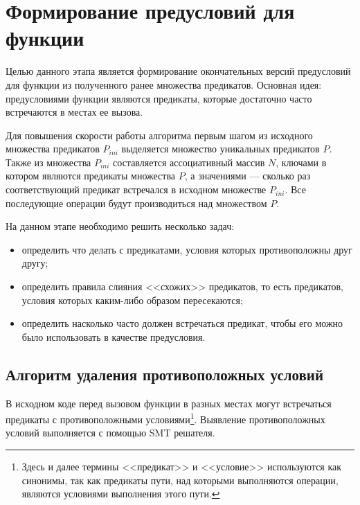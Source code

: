 \section{Формирование предусловий для функции}
\label{section:merging}
Целью данного этапа является формирование окончательных версий предусловий для функции из полученного ранее множества предикатов. Основная идея: предусловиями функции являются предикаты, которые достаточно часто встречаются в местах ее вызова. 

Для повышения скорости работы алгоритма первым шагом из исходного множества предикатов $P_{ini}$ выделяется множество уникальных предикатов $P$. Также из множества $P_{ini}$ составляется ассоциативный массив $N$, ключами в котором являются предикаты множества $P$, а значениями --- сколько раз соответствующий предикат встречался в исходном множестве $P_{ini}$. Все последующие операции будут производиться над множеством $P$.

На данном этапе необходимо решить несколько задач:
\begin{itemize}
\item определить что делать с предикатами, условия которых противоположны друг другу;
\item определить правила слияния <<схожих>> предикатов, то есть предикатов, условия которых каким-либо образом пересекаются;
\item определить насколько часто должен встречаться предикат, чтобы его можно было использовать в качестве предусловия.
\end{itemize}

\subsection{Алгоритм удаления противоположных условий}
\label{section:deleting}
В исходном коде перед вызовом функции в разных местах могут встречаться предикаты с противоположными условиями\footnote{Здесь и далее термины <<предикат>> и <<условие>> используются как синонимы, так как предикаты пути, над которыми выполняются операции, являются условиями выполнения этого пути.}. Выявление противоположных условий выполняется с помощью SMT решателя. 

